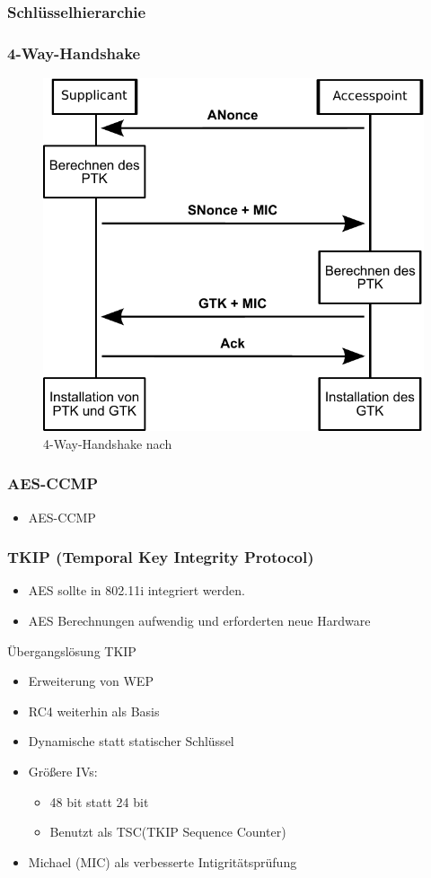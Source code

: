 \documentclass{beamer}
\begin{document}
\begin{frame}
\frametitle{Schlüsselhierarchie}
\end{frame}

\begin{frame}
\frametitle{4-Way-Handshake}
\begin{figure}
	\includegraphics[width=0.5\linewidth]{figures/4-way-handshake.pdf}
	\caption{4-Way-Handshake nach \cite{ieee802.11}}
\end{figure}
\end{frame}

\begin{frame}
\frametitle{AES-CCMP}
\begin{itemize}
	\item AES-CCMP
\end{itemize}
\end{frame}

\begin{frame}
\frametitle{TKIP (Temporal Key Integrity Protocol)}
\begin{itemize}
	\item AES sollte in 802.11i integriert werden.
	\item AES Berechnungen aufwendig und erforderten neue Hardware
\end{itemize}
\begin{block}{Übergangslösung TKIP}
	\begin{itemize}
		\item Erweiterung von WEP
		\item RC4 weiterhin als Basis
		\item Dynamische statt statischer Schlüssel
		\item Größere IVs:
		\begin{itemize}
			\item 48 bit statt 24 bit
			\item Benutzt als TSC(TKIP Sequence Counter)
		\end{itemize}
		\item Michael (MIC) als verbesserte Intigritätsprüfung
	\end{itemize}
\end{block}
\end{frame}
\end{document}

